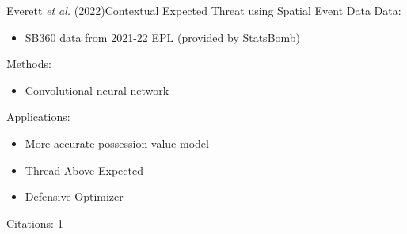 \documentclass{beamer}
\begin{document}
  \begin{frame}{Everett {\it et al.} (2022)}{Contextual Expected Threat using Spatial Event Data}
    Data:
    \begin{itemize}
      \item SB360 data from 2021-22 EPL (provided by StatsBomb)
    \end{itemize}
    Methods:
    \begin{itemize}
      \item Convolutional neural network
    \end{itemize}
    Applications:
    \begin{itemize}
      \item More accurate possession value model
      \item Thread Above Expected
      \item Defensive Optimizer
    \end{itemize}
    Citations: 1
  \end{frame}
\end{document}
